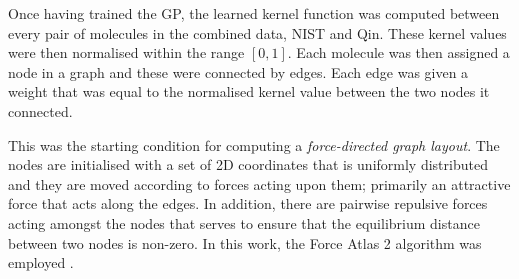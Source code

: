 Once having trained the GP, the learned kernel function was computed between
every pair of molecules in the combined data, NIST and Qin. These kernel values
were then normalised within the range $[0, 1]$. Each molecule was then assigned
a node in a graph and these were connected by edges. Each edge was given a
weight that was equal to the normalised kernel value between the two nodes it
connected.

This was the starting condition for computing a \emph{force-directed graph
    layout}. The nodes are initialised with a set of 2D coordinates that is
uniformly distributed and they are moved according to forces acting upon them;
primarily an attractive force that acts along the edges. In addition, there are
pairwise repulsive forces acting amongst the nodes that serves to ensure that
the equilibrium distance between two nodes is non-zero. In this work, the Force
Atlas 2 algorithm was employed
\cite{jacomyForceAtlas2ContinuousGraph2014,bastianGephiOpenSource2009}.